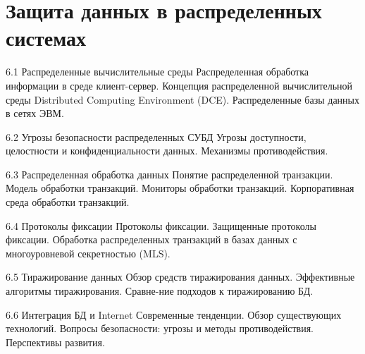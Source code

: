 \section{Защита данных в распределенных системах}

6.1 Распределенные вычислительные среды
Распределенная обработка информации в среде клиент-сервер. Концепция распределенной вычислительной среды Distributed Computing Environment (DCE). Распределенные базы данных в сетях ЭВМ.

6.2 Угрозы безопасности распределенных СУБД
Угрозы доступности, целостности и конфиденциальности данных. Механизмы противодействия.

6.3 Распределенная обработка данных
Понятие распределенной транзакции. Модель обработки транзакций. Мониторы обработки транзакций. Корпоративная среда обработки транзакций. 

6.4 Протоколы фиксации 
Протоколы фиксации. Защищенные протоколы фиксации. Обработка распределенных транзакций в базах данных с многоуровневой секретностью (MLS).

6.5 Тиражирование данных	
Обзор средств тиражирования данных. Эффективные алгоритмы тиражирования. Сравне-ние подходов к тиражированию БД.

6.6 Интеграция БД и Internet
Современные тенденции. Обзор существующих технологий. Вопросы безопасности: угрозы и методы противодействия. Перспективы развития.